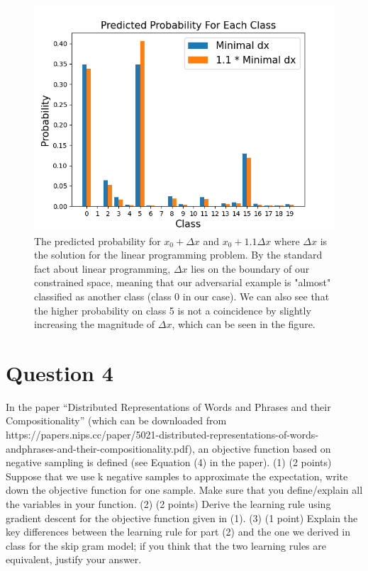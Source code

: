 \documentclass[
	12pt, %
]{../Template/fphw}
\begin{document}
\begin{enumerate}[label = (\arabic*)]
    \begin{figure}[!htbp]
        \centering
        \includegraphics[width=\linewidth]{HW1/q4-5.png}
        \caption{The predicted probability for $x_0+\Delta x$ and $x_0+1.1\Delta x$ where $\Delta x$ is the solution for the linear programming problem. By the standard fact about linear programming, $\Delta x$ lies on the boundary of our constrained space, meaning that our adversarial example is "almost" classified as another class (class 0 in our case). We can also see that the higher probability on class 5 is not a coincidence by slightly increasing the magnitude of $\Delta x$, which can be seen in the figure.}
        \label{fig:q4-5}
    \end{figure}
\end{enumerate}

\section*{Question 4}

\begin{problem}
In the paper “Distributed Representations of Words and Phrases and their Compositionality”
(which can be downloaded from https://papers.nips.cc/paper/5021-distributed-representations-of-words-andphrases-and-their-compositionality.pdf), an objective function based on negative sampling is defined (see Equation
(4) in the paper).
(1) (2 points) Suppose that we use k negative samples to approximate the expectation, write down the objective
function for one sample. Make sure that you define/explain all the variables in your function.
(2) (2 points) Derive the learning rule using gradient descent for the objective function given in (1).
(3) (1 point) Explain the key differences between the learning rule for part (2) and the one we derived in class
for the skip gram model; if you think that the two learning rules are equivalent, justify your answer.

\end{problem}
\end{document}
